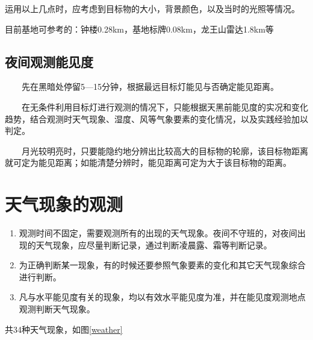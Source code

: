 ﻿\documentclass[UTF8,11pt]{ctexbook}%
\begin{document}
运用以上几点时，应考虑到目标物的大小，背景颜色，以及当时的光照等情况。

目前基地可参考的：钟楼0.28km，基地标牌0.08km，龙王山雷达1.8km等

\subsection{夜间观测能见度}

　　先在黑暗处停留5—15分钟，根据最远目标灯能见与否确定能见距离。

　　在无条件利用目标灯进行观测的情况下，只能根据天黑前能见度的实况和变化趋势，结合观测时天气现象、湿度、风等气象要素的变化情况，以及实践经验加以判定。

　　月光较明亮时，只要能隐约地分辨出比较高大的目标物的轮廓，该目标物距离就可定为能见距离；如能清楚分辨时，能见距离可定为大于该目标物的距离。

\section{天气现象的观测}

\begin{enumerate}
	\item 观测时间不固定，需要观测所有的出现的天气现象。夜间不守班的，对夜间出现的天气现象，应尽量判断记录，通过判断凌晨露、霜等判断记录。
	\item 为正确判断某一现象，有的时候还要参照气象要素的变化和其它天气现象综合进行判断。
	\item 凡与水平能见度有关的现象，均以有效水平能见度为准，并在能见度观测地点观测判断天气现象。
\end{enumerate}
共34种天气现象，如图\ref{weather}
\end{document}
